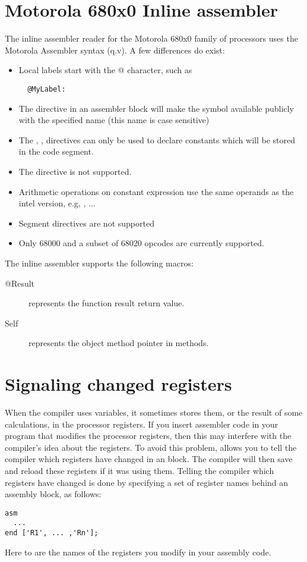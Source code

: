 \section{Motorola 680x0 Inline assembler}

The inline assembler reader for the Motorola 680x0 family of processors
uses the Motorola Assembler syntax (q.v). A few differences do exist:

\begin{itemize}
\item Local labels start with the @ character, such as
\begin{verbatim}
  @MyLabel:
\end{verbatim}
\item The  directive in an assembler block will
make the symbol available publicly with the specified name
(this name is case sensitive)
\item The , ,  directives can only
be used to declare constants which will be stored in the
code segment.
\item The  directive is not supported.
\item Arithmetic operations on constant expression use the same
operands as the intel version, e.g, ,  ...
\item Segment directives are not supported
\item Only 68000 and a subset of 68020 opcodes are currently supported.
\end{itemize}

The inline assembler supports the following macros:
\begin{description}
\item [@Result] represents the function result return value.
\item [Self] represents the object method pointer in methods.
\end{description}



\section{Signaling changed registers}
\label{se:RegChanges}
When the compiler uses variables, it sometimes stores them, or the result of
some calculations, in the processor registers. If you insert assembler code
in your program that modifies the processor registers, then this may
interfere with the compiler's idea about the registers. To avoid this
problem, \fpc allows you to tell the compiler which registers have changed
in an  block.
The compiler will then save and reload these registers if it was using them. 
Telling the compiler which registers have changed is done by specifying a 
set of register names
behind an assembly block, as follows:
\begin{verbatim}
asm
  ...
end ['R1', ... ,'Rn'];
\end{verbatim}
Here  to  are the names of the registers you
modify in your assembly code.

